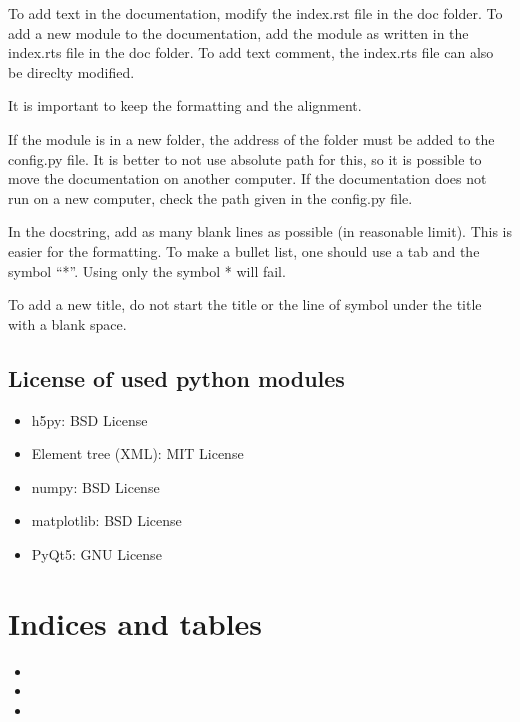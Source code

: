 \documentclass[letterpaper,10pt,english]{sphinxmanual}
\begin{document}
To add text in the documentation, modify the index.rst file in the doc folder. To add a new module to the
documentation, add the module as written in the index.rts file in the doc folder. To add text comment, the index.rts file can also be direclty modified.

It is important to keep the formatting and the alignment.

If the module is in a new folder, the address of the folder must be added to the config.py file.
It is better to not use absolute path for this, so it is possible to move the documentation on another
computer. If the documentation does not run on a new computer, check the path given in the config.py file.

In the docstring, add as many blank lines as possible (in reasonable limit). This is easier for the
formatting. To make a bullet list, one should use a tab and the symbol “*”.  Using only the symbol * will
fail.

To add a new title, do not start the title or the line of symbol under the title with a blank space.


\section{License of used python modules}
\label{\detokenize{index:license-of-used-python-modules}}\begin{itemize}
\item {} 
h5py: BSD License

\item {} 
Element tree (XML): MIT License

\item {} 
numpy: BSD License

\item {} 
matplotlib: BSD License

\item {} 
PyQt5: GNU License

\end{itemize}


\chapter{Indices and tables}
\label{\detokenize{index:indices-and-tables}}\begin{itemize}
\item {} 

\item {} 

\item {} 

\end{itemize}
\end{document}
